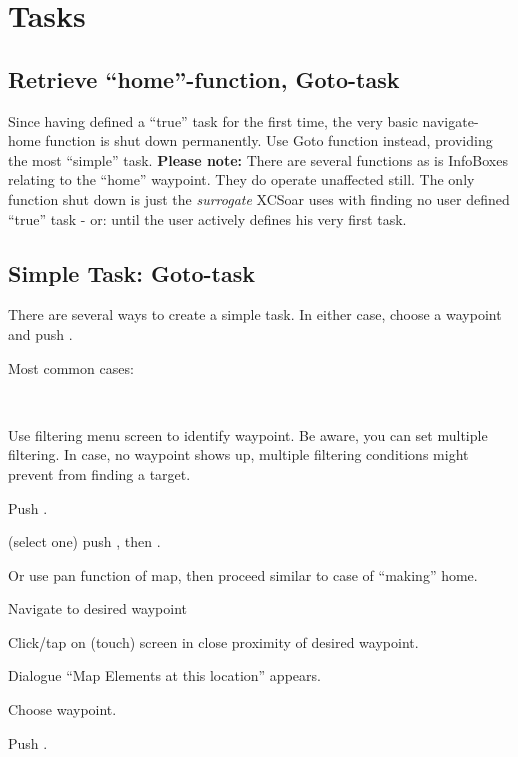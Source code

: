 \documentclass[english,a4paper,12pt]{refrep}
\newcommand{\nav}[3]{\bmenut{Nav}{#1/2}{\LARGE$\triangleright$}~\bmenut{#2}{#3}}%
\begin{document}
\section{Tasks}

\subsection{\textcolor{flashblue}{Retrieve ``home''-function, Goto-task}}
Since having defined a ``true'' task for the first time, the very basic navigate-
home function is shut down permanently. Use Goto function instead, providing
the most ``simple'' task. \textbf{Please note:} There are several functions as is 
InfoBoxes relating to the ``home'' waypoint. They do operate unaffected still. 
The only function shut down is just the \emph{surrogate} XCSoar uses with 
finding no user defined ``true'' task - or: until the user actively defines his 
very first task.
\subsection{\textcolor{flashblue}{Simple Task: Goto-task}}
There are several ways to create a simple task. In either case, choose a 
waypoint and push .

Most common cases:
\begin{flushleft}\hspace*{1cm}\nav{1}{Waypoint}{List}\\\end{flushleft}
\begin{compactitem}
\item Use filtering menu screen to identify waypoint. Be aware, you can set 
multiple filtering. In case, no waypoint shows up, multiple filtering 
conditions might prevent from finding a target.
\item Push .
\item (select one) push , then .
\end{compactitem}
Or use pan function of map, then proceed similar to case of ``making'' home.
\begin{compactitem}
\item Navigate to desired waypoint
\item Click/tap on (touch) screen in close proximity of desired waypoint.
\item Dialogue ``Map Elements at this location'' appears.
\item Choose waypoint.
\item Push .
\end{compactitem}
 
\end{document}
